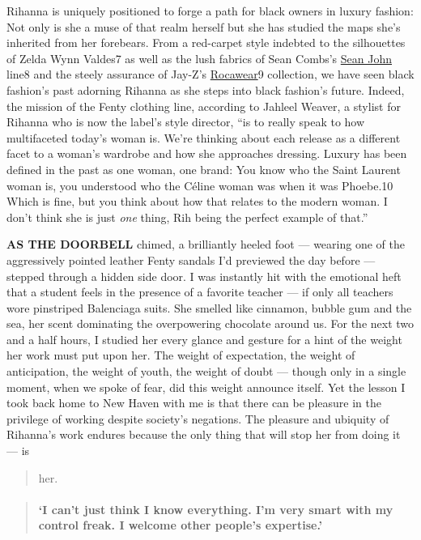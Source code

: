 Rihanna is uniquely positioned to forge a path for black owners in
luxury fashion: Not only is she a muse of that realm herself but she has
studied the maps she's inherited from her forebears. From a red-carpet
style indebted to the silhouettes of Zelda Wynn Valdes7 as well as the
lush fabrics of Sean Combs's \href{http://seanjohn.com/}{Sean John}
line8 and the steely assurance of Jay-Z's
\href{https://www.rocawear.com/}{Rocawear}9 collection, we have seen
black fashion's past adorning Rihanna as she steps into black fashion's
future. Indeed, the mission of the Fenty clothing line, according to
Jahleel Weaver, a stylist for Rihanna who is now the label's style
director, ``is to really speak to how multifaceted today's woman is.
We're thinking about each release as a different facet to a woman's
wardrobe and how she approaches dressing. Luxury has been defined in the
past as one woman, one brand: You know who the Saint Laurent woman is,
you understood who the Céline woman was when it was Phoebe.10 Which is
fine, but you think about how that relates to the modern woman. I don't
think she is just \emph{one} thing, Rih being the perfect example of
that.''

\textbf{AS THE DOORBELL} chimed, a brilliantly heeled foot --- wearing
one of the aggressively pointed leather Fenty sandals I'd previewed the
day before --- stepped through a hidden side door. I was instantly hit
with the emotional heft that a student feels in the presence of a
favorite teacher --- if only all teachers wore pinstriped Balenciaga
suits. She smelled like cinnamon, bubble gum and the sea, her scent
dominating the overpowering chocolate around us. For the next two and a
half hours, I studied her every glance and gesture for a hint of the
weight her work must put upon her. The weight of expectation, the weight
of anticipation, the weight of youth, the weight of doubt --- though
only in a single moment, when we spoke of fear, did this weight announce
itself. Yet the lesson I took back home to New Haven with me is that
there can be pleasure in the privilege of working despite society's
negations. The pleasure and ubiquity of Rihanna's work endures because
the only thing that will stop her from doing it --- is

\begin{quote}
her.
\end{quote}

\begin{quote}
\mbox{}%
\hypertarget{i-cant-just-think-i-know-everything-im-very-smart-with-my-control-freak-i-welcome-other-peoples-expertise}{%
\paragraph{\texorpdfstring{\textbf{`I can't just think I know
everything.} \textbf{I'm very smart with my control freak.} \textbf{I
welcome other people's
expertise.'}}{`I can't just think I know everything. I'm very smart with my control freak. I welcome other people's expertise.'}}\label{i-cant-just-think-i-know-everything-im-very-smart-with-my-control-freak-i-welcome-other-peoples-expertise}}
\end{quote}

